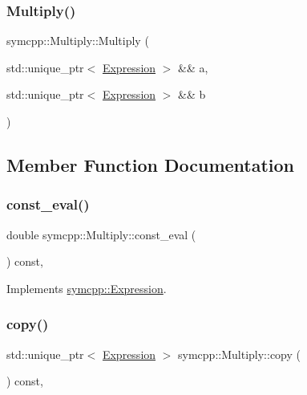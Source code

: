 \subsubsection{\texorpdfstring{Multiply()}{Multiply()}\hspace{0.1cm}{\footnotesize\ttfamily [2/2]}}
{\footnotesize\ttfamily symcpp\+::\+Multiply\+::\+Multiply (\begin{DoxyParamCaption}\item[{std\+::unique\+\_\+ptr$<$ \mbox{\hyperlink{classsymcpp_1_1Expression}{Expression}} $>$ \&\&}]{a,  }\item[{std\+::unique\+\_\+ptr$<$ \mbox{\hyperlink{classsymcpp_1_1Expression}{Expression}} $>$ \&\&}]{b }\end{DoxyParamCaption})}



\subsection{Member Function Documentation}
\mbox{\label{classsymcpp_1_1Multiply_a1d9b8023ab0bf35c011eb7f3ee8d4c32}} 
\subsubsection{\texorpdfstring{const\_eval()}{const\_eval()}}
{\footnotesize\ttfamily double symcpp\+::\+Multiply\+::const\+\_\+eval (\begin{DoxyParamCaption}{ }\end{DoxyParamCaption}) const\hspace{0.3cm}{\ttfamily [override]}, {\ttfamily [virtual]}}



Implements \mbox{\hyperlink{classsymcpp_1_1Expression_a81c8069347f586cb5632338d97c278ad}{symcpp\+::\+Expression}}.

\mbox{\label{classsymcpp_1_1Multiply_adcd57ab1c1a27eb10aeeb572cdd14e5e}} 
\subsubsection{\texorpdfstring{copy()}{copy()}}
{\footnotesize\ttfamily std\+::unique\+\_\+ptr$<$ \mbox{\hyperlink{classsymcpp_1_1Expression}{Expression}} $>$ symcpp\+::\+Multiply\+::copy (\begin{DoxyParamCaption}{ }\end{DoxyParamCaption}) const\hspace{0.3cm}{\ttfamily [override]}, {\ttfamily [virtual]}}



